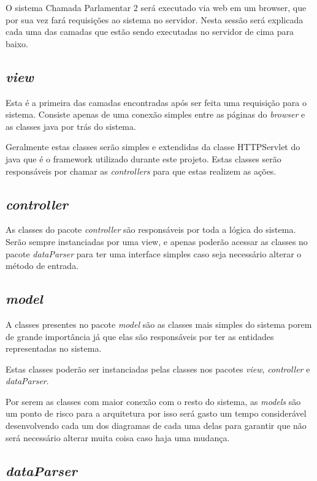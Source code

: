 O sistema Chamada Parlamentar 2 será executado via web em um browser, que por sua vez fará requisições ao sistema no servidor. Nesta sessão será explicada cada uma das camadas que estão sendo executadas no servidor de cima para baixo.

\subsection{\textit{view}}
	
	Esta é a primeira das camadas encontradas após ser feita uma requisição para o sistema. Consiste apenas de uma conexão simples entre as páginas do \textit{browser} e as classes java por trás do sistema.

	Geralmente estas classes serão simples e extendidas da classe HTTPServlet do java que é o framework utilizado durante este projeto. Estas classes serão responsáveis por chamar as \textit{controllers} para que estas realizem as ações.

\subsection{\textit{controller}}

	As classes do pacote \textit{controller} são responsáveis por toda a lógica do sistema. Serão sempre instanciadas por uma view, e apenas poderão acessar as classes no pacote \textit{dataParser} para ter uma interface simples caso seja necessário alterar o método de entrada.

\subsection{\textit{model}}

	A classes presentes no pacote \textit{model} são as classes mais simples do sistema porem de grande importância já que elas são responsáveis por ter as entidades representadas no sistema.

	Estas classes poderão ser instanciadas pelas classes nos pacotes \textit{view}, \textit{controller} e \textit{dataParser}.

	Por serem as classes com maior conexão com o resto do sistema, as \textit{models} são um ponto de risco para a arquitetura por isso será gasto um tempo considerável desenvolvendo cada um dos diagramas de cada uma delas para garantir que não será necessário alterar muita coisa caso haja uma mudança.

\subsection{\textit{dataParser}}

